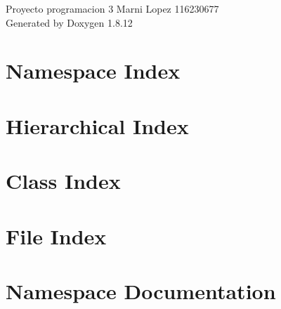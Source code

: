 \documentclass[twoside]{book}
\newcommand{\+}{\discretionary{\mbox{\scriptsize$\hookleftarrow$}}{}{}}
\newcommand{\clearemptydoublepage}{%
  \newpage{\pagestyle{empty}\cleardoublepage}%
}
\begin{document}
\hypersetup{pageanchor=false,
             bookmarksnumbered=true,
             pdfencoding=unicode
            }
\begin{titlepage}
\vspace*{7cm}
\begin{center}%
{\Large Proyecto programacion 3 Marni Lopez 116230677 }\\
\vspace*{1cm}
{\large Generated by Doxygen 1.8.12}\\
\end{center}
\end{titlepage}
\clearemptydoublepage
{}
\tableofcontents
\clearemptydoublepage
{}
\hypersetup{pageanchor=true}

\chapter{Namespace Index}

\chapter{Hierarchical Index}

\chapter{Class Index}

\chapter{File Index}

\chapter{Namespace Documentation}












\end{document}
